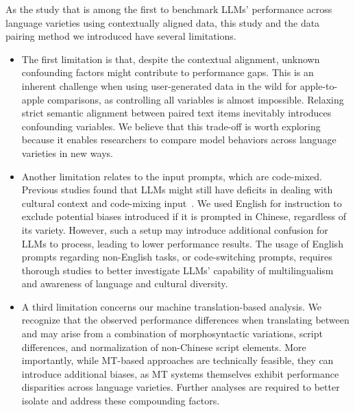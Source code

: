 As the study that is among the first to benchmark LLMs' performance across language varieties using contextually aligned data, this study and the data pairing method we introduced have several limitations. 

\begin{itemize}
    \item 

The first limitation is that, despite the contextual alignment, unknown confounding factors might contribute to performance gaps. 
This is an inherent challenge when using user-generated data in the wild for apple-to-apple comparisons, as controlling all variables is almost impossible.
Relaxing strict semantic alignment between paired text items inevitably introduces confounding variables.
We believe that this trade-off is worth exploring because it enables researchers to compare model behaviors across language varieties in new ways. 

\item 
Another limitation relates to the input prompts, which are code-mixed. Previous studies found that LLMs might still have deficits in dealing with cultural context and code-mixing input~\cite{ochieng2024beyond}. 
We used English for instruction to exclude potential biases introduced if it is prompted in Chinese, regardless of its variety. 
However, such a setup may introduce additional confusion for LLMs to process, leading to lower performance results. The usage of English prompts regarding non-English tasks, or code-switching prompts, requires thorough studies to better investigate LLMs' capability of multilingualism and awareness of language and cultural diversity.

\item 
A third limitation concerns our machine translation-based analysis.
We recognize that the observed performance differences when translating between \twChinese and \cnChinese
may arise from a combination of morphosyntactic variations, script differences,
and normalization of non-Chinese script elements.
More importantly, while MT-based approaches are technically feasible,
they can introduce additional biases, as MT systems themselves exhibit performance disparities across language varieties.
Further analyses are required to better isolate and address these compounding factors.

\end{itemize}
